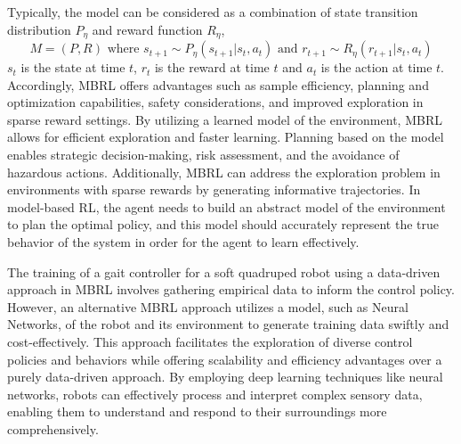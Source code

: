 Typically, the model can be considered as a combination of state transition distribution $P_\eta$ and reward function $R_\eta$, $$M = (P,R) \textrm{ where } s_{t+1}\sim P_\eta(s_{t+1}|s_t, a_t) \textrm{ and } r_{t+1}\sim R_\eta(r_{t+1}|s_t, a_t)$$ $s_t$ is the state at time $t$, $r_t$ is the reward at time $t$ and $a_t$ is the action at time $t$. Accordingly, \ac{MBRL} offers advantages such as sample efficiency, planning and optimization capabilities, safety considerations, and improved exploration in sparse reward settings. By utilizing a learned model of the environment, \ac{MBRL} allows for efficient exploration and faster learning. Planning based on the model enables strategic decision-making, risk assessment, and the avoidance of hazardous actions. Additionally, MBRL can address the exploration problem in environments with sparse rewards by generating informative trajectories. In model-based \ac{RL}, the agent needs to build an abstract model of the environment to plan the optimal policy, and this model should accurately represent the true behavior of the system in order for the agent to learn effectively.

The training of a gait controller for a soft quadruped robot using a data-driven approach in \ac{MBRL} involves gathering empirical data to inform the control policy. However, an alternative MBRL approach utilizes a model, such as Neural Networks, of the robot and its environment to generate training data swiftly and cost-effectively.  This approach facilitates the exploration of diverse control policies and behaviors while offering scalability and efficiency advantages over a purely data-driven approach. By employing deep learning techniques like neural networks, robots can effectively process and interpret complex sensory data, enabling them to understand and respond to their surroundings more comprehensively.

